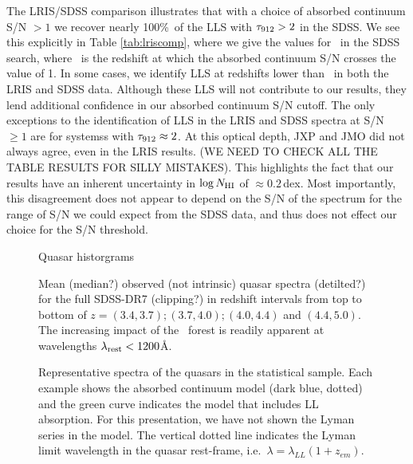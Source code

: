 \documentclass[12pt,preprint]{aastex}
\begin{document}
The LRIS/SDSS comparison illustrates that with a choice of absorbed
continuum S/N $>1$ 
we recover nearly 100\%\ of the LLS with  $\tau_{\rm 912} > 2$ in the SDSS.  We see this
explicitly in Table \ref{tab:lriscomp}, where we give the values for
\zstrt\ in the SDSS search, where \zstrt\ is the redshift at which
the absorbed continuum S/N crosses the value of 1.  In some cases, we
identify LLS at redshifts lower than \zstrt\ in both the LRIS and
SDSS data.  Although these LLS will not contribute to our results,
they lend additional confidence in our absorbed continuum S/N cutoff.
The only exceptions to the identification of LLS in the LRIS and 
SDSS spectra at S/N~$\ge 1$ are for systemss with $\tau_{\rm 912} \approx 2$.
At this optical depth, JXP and JMO did not always
agree, even in the LRIS results. 
(WE NEED TO CHECK ALL THE TABLE RESULTS FOR SILLY MISTAKES).  
This highlights the fact that our results have an inherent uncertainty
in $\log N_{\rm HI}$ of $\approx 0.2$\,dex. 
Most importantly, this
disagreement does not appear to depend on the S/N of the spectrum for
the range of S/N we could expect from the SDSS data, and thus does not
effect our choice for the S/N threshold.












%
%
%

\begin{figure}
\caption{Quasar historgrams
}
\label{fig:snz}
\end{figure}


\begin{figure}
\caption{Mean (median?) observed (not intrinsic)
quasar spectra (detilted?) for 
the full SDSS-DR7 (clipping?) in redshift intervals from
top to bottom of $z=(3.4,3.7); (3.7,4.0); (4.0,4.4)$ and
$(4.4, 5.0)$.    
The increasing impact of the \lya\ forest is readily apparent
at wavelengths $\lambda_{\rm rest} < 1200$\AA.
}
\label{fig:template}
\end{figure}


\begin{figure}
\caption{Representative spectra of the quasars in the statistical sample.
Each example shows the absorbed continuum model (dark blue, dotted)
and the green curve indicates the model that includes LL absorption. 
For this presentation, we have not shown the Lyman series in the model.
The vertical dotted line indicates the Lyman limit wavelength
in the quasar rest-frame, i.e.\ $\lambda = \lambda_{LL} (1+z_{em})$.
}
\label{fig:ex_conti}
\end{figure}
\end{document}
